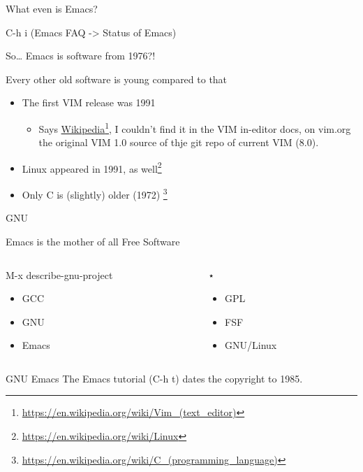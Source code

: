 \documentclass[bigger]{beamer}
\begin{document}
\begin{frame}[fragile,label={sec:org3f2af96}]{What even is Emacs?}
 \begin{block}{C-h i (Emacs FAQ -> Status of Emacs)}
\end{block}
\end{frame}

\begin{frame}[label={sec:orge9e8b1e}]{So\ldots{} Emacs is software from 1976?!}
\begin{block}{Every other old software is \alert{young} compared to that}
\begin{itemize}
\item The first VIM release was 1991
\begin{itemize}
\item Says \href{https://en.wikipedia.org/wiki/Vim\_(text\_editor)}{Wikipedia}\footnote{\url{https://en.wikipedia.org/wiki/Vim\_(text\_editor)}}, I couldn't find it in the VIM in-editor
docs, on vim.org the original VIM 1.0 source of thje git repo of
current VIM (8.0).
\end{itemize}
\item Linux appeared in 1991, as well\footnote{\url{https://en.wikipedia.org/wiki/Linux}}
\item Only C is (slightly) older (1972) \footnote{\url{https://en.wikipedia.org/wiki/C\_(programming\_language)}}
\end{itemize}
\end{block}
\end{frame}

\begin{frame}[fragile,label={sec:org3c6973e}]{GNU}
 \begin{block}{Emacs is the mother of all \alert{Free Software}}
\begin{columns}
\begin{column}{0.50\columnwidth}
\begin{block}{M-x describe-gnu-project}
\begin{itemize}
\item GCC
\item GNU
\item Emacs
\end{itemize}
\end{block}
\end{column}

\begin{column}{0.50\columnwidth}
\begin{block}{⋆}
\begin{itemize}
\item GPL
\item FSF
\item GNU/Linux
\end{itemize}
\end{block}
\end{column}
\end{columns}
\end{block}

\begin{block}{GNU Emacs}
The Emacs tutorial (C-h t) dates the copyright to 1985.
\end{block}
\end{frame}
\end{document}
